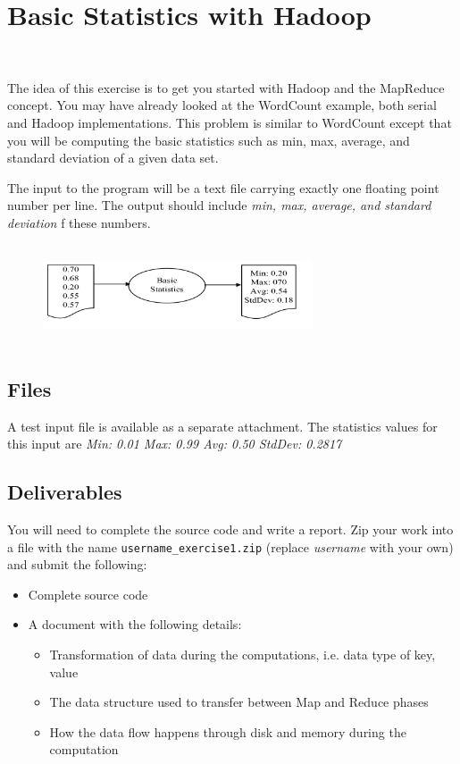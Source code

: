 
\section{Basic Statistics with Hadoop}       
\FILENAME\


The idea of this exercise is to get you started with Hadoop and the
MapReduce concept. You may have already looked at the WordCount
example, both serial and Hadoop implementations. This problem is
similar to WordCount except that you will be computing the basic
statistics such as min, max, average, and standard deviation of a
given data set.

The input to the program will be a text file carrying exactly one
floating point number per line. The output should include \textit{min,
  max, average, and standard deviation} f these numbers.

\begin{figure}[!htbp]
\includegraphics[width=8cm,height=3cm]{section/icloud/assignment/exercise1/p1example.png}
\centering
\end{figure}

\subsection{Files}

A test input file is available as a separate attachment.  The
statistics values for this input are \textit{Min: 0.01 Max: 0.99 Avg:
  0.50 StdDev: 0.2817}


\subsection{Deliverables}

You will need to complete the source code and write a report. Zip your
work into a file with the name \verb|username_exercise1.zip| (replace
\textit{username} with your own) and submit the following:

\begin{itemize}
\item Complete source code
\item A document with the following details:

  \begin{itemize}
  \item	Transformation of data during the computations, i.e. data type of key, value
  \item	The data structure used to transfer between Map and Reduce phases
  \item	How the data flow happens through disk and memory during the computation
  \end{itemize}

\end{itemize}

